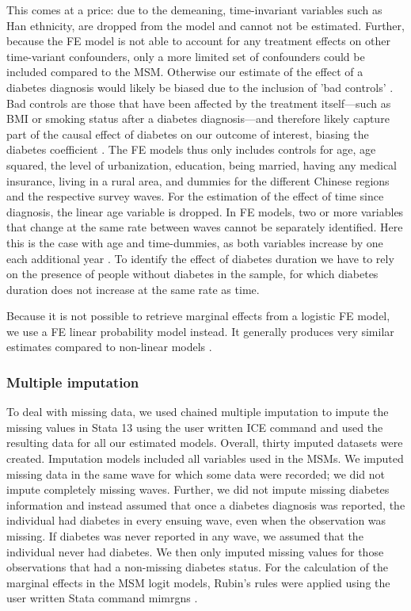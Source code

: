 This comes at a price: due to the demeaning, time-invariant variables such as Han ethnicity, are dropped from the model and cannot not be estimated. Further, because the \ac{FE} model is not able to account for any treatment effects on other time-variant confounders, only a more limited set of confounders could be included compared to the \ac{MSM}. Otherwise our estimate of the effect of a diabetes diagnosis would likely be biased due to the inclusion of 'bad controls' \parencite{Angrist2009a}. Bad controls are those that have been affected by the treatment itself---such as \ac{BMI} or smoking status after a diabetes diagnosis---and therefore likely capture part of the causal effect of diabetes on our outcome of interest, biasing the diabetes coefficient \parencite{Angrist2009a}. The \ac{FE} models thus only includes controls for age, age squared, the level of urbanization, education, being married, having any medical insurance, living in a rural area, and dummies for the different Chinese regions and the respective survey waves. For the estimation of the effect of time since diagnosis, the linear age variable is dropped. In \ac{FE} models, two or more variables that change at the same rate between waves cannot be separately identified. Here this is the case with age and time-dummies, as both variables increase by one each additional year \parencite{Wooldridge2012}. To identify the effect of diabetes duration we have to rely on the presence of people without diabetes in the sample, for which diabetes duration does not increase at the same rate as time.

Because it is not possible to retrieve marginal effects from a logistic \ac{FE} model, we use a \ac{FE} linear probability model instead. It generally produces very similar estimates compared to non-linear models \parencite{Angrist2009a}.

\subsubsection*{Multiple imputation}

To deal with missing data, we used chained multiple imputation to impute the missing values in Stata 13 using the user written ICE command \parencite{Royston2009} and used the resulting data for all our estimated models. Overall, thirty imputed datasets were created. Imputation models included all variables used in the \acp{MSM}. We imputed missing data in the same wave for which some data were recorded; we did not impute completely missing waves. Further, we did not impute missing diabetes information and instead assumed that once a diabetes diagnosis was reported, the individual had diabetes in every ensuing wave, even when the observation was missing. If diabetes was never reported in any wave, we assumed that the individual never had diabetes. We then only imputed missing values for those observations that had a non-missing diabetes status. For the calculation of the marginal effects in the \ac{MSM} logit models, Rubin's rules were applied using the user written Stata command mimrgns \parencite{Klein2014}.

